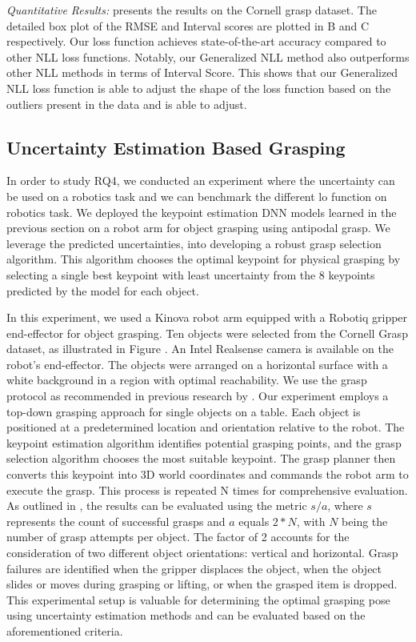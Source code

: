 \documentclass[letterpaper, 10 pt, conference]{ieeeconf}  %
\begin{document}
\textit{Quantitative Results:}
 presents the results on the Cornell grasp dataset. The detailed box plot of the RMSE and Interval scores are plotted in  B and C respectively. Our loss function achieves state-of-the-art accuracy compared to other NLL loss functions. Notably, our Generalized NLL method also outperforms other NLL methods in terms of Interval Score. 
This shows that our Generalized NLL loss function is able to adjust the shape of the loss function based on the outliers present in the data and is able to adjust. 


\subsection{Uncertainty Estimation Based Grasping}
In order to study RQ4, we conducted an experiment where the uncertainty can be used on a robotics task and we can benchmark the different lo function on robotics task. We deployed the keypoint estimation DNN models learned in the previous section on a robot arm for object grasping using antipodal grasp. We leverage the predicted uncertainties, into developing a robust grasp selection algorithm. This algorithm chooses the optimal keypoint for physical grasping by selecting a single best keypoint with least uncertainty from the 8 keypoints predicted by the model for each object.

In this experiment, we used a Kinova robot arm equipped with a Robotiq gripper end-effector for object grasping. Ten objects were selected from the Cornell Grasp dataset, as illustrated in Figure . An Intel Realsense camera is available on the robot's end-effector. The objects were arranged on a horizontal surface with a white background in a region with optimal reachability.
We use the grasp protocol as recommended in previous research by \cite{bekiroglu2019benchmarking}. Our experiment employs a top-down grasping approach for single objects on a table. Each object is positioned at a predetermined location and orientation relative to the robot. The keypoint estimation algorithm identifies potential grasping points, and the grasp selection algorithm chooses the most suitable keypoint. The grasp planner then converts this keypoint into 3D world coordinates and commands the robot arm to execute the grasp. This process is repeated N times for comprehensive evaluation.
As outlined in \cite{bekiroglu2019benchmarking}, the results can be evaluated using the metric $s/a$, where $s$ represents the count of successful grasps and $a$ equals $2 * N$, with $N$ being the number of grasp attempts per object. The factor of 2 accounts for the consideration of two different object orientations: vertical and horizontal. Grasp failures are identified when the gripper displaces the object, when the object slides or moves during grasping or lifting, or when the grasped item is dropped. This experimental setup is valuable for determining the optimal grasping pose using uncertainty estimation methods and can be evaluated based on the aforementioned criteria.
\end{document}
